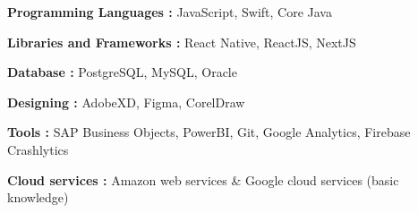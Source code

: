 


\begin{itemize}
\small{
    \item \textbf{Programming Languages : }JavaScript, Swift, Core Java
    \vspace{0.2em}
    \item \textbf{Libraries and Frameworks : }React Native, ReactJS, NextJS
    \vspace{0.2em}
    \item \textbf{Database : }PostgreSQL, MySQL, Oracle
    \vspace{0.2em}
    \item \textbf{Designing : }AdobeXD, Figma, CorelDraw
    \vspace{0.2em}
    \item \textbf{Tools : }SAP Business Objects, PowerBI, Git, Google Analytics, Firebase Crashlytics
    \vspace{0.2em}
    \item \textbf{Cloud services : }Amazon web services \& Google cloud services (basic knowledge)
    }
\end{itemize}